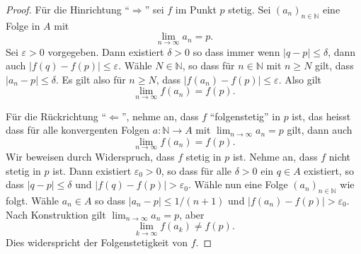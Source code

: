 \documentclass[../main.tex]{subfiles}
\begin{document}
\begin{proof}
  Für die Hinrichtung ``$\Rightarrow$'' sei $f$
  im Punkt $p$ stetig. Sei ${(a_{n})}_{n \in \mathbb{N}}$ 
  eine Folge in $A$ mit
  \[
    \lim_{n \to \infty} a_n = p.
  \]
  Sei $\varepsilon > 0$ vorgegeben.
  Dann existiert $\delta > 0$ so dass immer wenn
  $|q - p| \leq \delta$, dann auch
  $|f(q) - f(p)| \leq \varepsilon$.
  Wähle $N \in \mathbb{N}$, so
  dass für $n \in \mathbb{N}$ mit $n \geq N$ gilt,
  dass $|a_n - p| \leq \delta$.
  Es gilt also für $n \geq N$, dass
  $|f(a_n) - f(p)| \leq \varepsilon$.
  Also gilt
  \[
    \lim_{n \to \infty} f(a_n) = f(p).
  \]
  
  Für die Rückrichtung ``$\Leftarrow$'', nehme an,
  dass $f$ ``folgenstetig'' in $p$ ist,
  das heisst dass für alle
  konvergenten Folgen $a \colon \mathbb{N} \to A$
  mit $\lim_{n \to \infty} a_n = p$ gilt,
  dann auch
  \[
    \lim_{n \to \infty} f(a_n) = f(p).
  \]
  Wir beweisen durch Widerspruch, dass
  $f$ stetig in $p$ ist.
  Nehme an, dass $f$ nicht stetig in $p$ ist.
  Dann existiert $\varepsilon_0 > 0$, so dass
  für alle $\delta > 0$ ein $q \in A$ 
  existiert, so dass
  $|q - p| \leq \delta$ und $|f(q) - f(p)| > \varepsilon_0$.
  Wähle nun eine Folge
  ${(a_{n})}_{n \in \mathbb{N}}$ wie folgt.
  Wähle $a_n \in A$ so dass
  $|a_n - p| \leq 1/(n+1)$ und $|f(a_n) - f(p)| > \varepsilon_0$.
  Nach Konstruktion gilt
  $\lim_{n \to \infty} a_n = p$, aber
  \[
    \lim_{k \to \infty} f(a_k) \neq f(p).
  \]
  Dies widerspricht der Folgenstetigkeit von $f$.
\end{proof}
\end{document}
